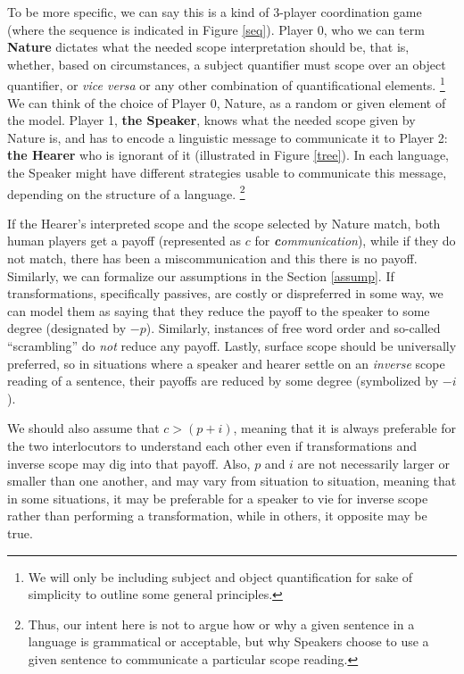 \documentclass{article}
\begin{document}
To be more specific, we can say this is a kind of 3-player coordination game (where the sequence is indicated in Figure \ref{seq}).
Player 0, who we can term \textbf{Nature} dictates what the needed scope interpretation should be, that is, whether, based on circumstances, a subject quantifier must scope over an object quantifier, or \emph{vice versa} or any other combination of quantificational elements.
\footnote{We will only be including subject and object quantification for sake of simplicity to outline some general principles.}
We can think of the choice of Player 0, Nature, as a random or given element of the model.
Player 1, \textbf{the Speaker}, knows what the needed scope given by Nature is, and has to encode a linguistic message to communicate it to Player 2: \textbf{the Hearer} who is ignorant of it (illustrated in Figure \ref{tree}).
In each language, the Speaker might have different strategies usable to communicate this message, depending on the structure of a language.
\footnote{Thus, our intent here is not to argue how or why a given sentence in a language is grammatical or acceptable, but why Speakers choose to use a given sentence to communicate a particular scope reading.}

If the Hearer's interpreted scope and the scope selected by Nature match, both human players get a payoff (represented as $c$ for \emph{\textbf{c}ommunication}), while if they do not match, there has been a miscommunication and this there is no payoff.
Similarly, we can formalize our assumptions in the Section \ref{assump}.
If transformations, specifically passives, are costly or dispreferred in some way, we can model them as saying that they reduce the payoff to the speaker to some degree (designated by $-p$).
Similarly, instances of free word order and so-called ``scrambling'' do \emph{not} reduce any payoff.
Lastly, surface scope should be universally preferred, so in situations where a speaker and hearer settle on an \emph{inverse} scope reading of a sentence, their payoffs are reduced by some degree (symbolized by $-i$).

We should also assume that $c > (p + i)$, meaning that it is always preferable for the two interlocutors to understand each other even if transformations and inverse scope may dig into that payoff.
Also, $p$ and $i$ are not necessarily larger or smaller than one another, and may vary from situation to situation, meaning that in some situations, it may be preferable for a speaker to vie for inverse scope rather than performing a transformation, while in others, it opposite may be true.
\end{document}
